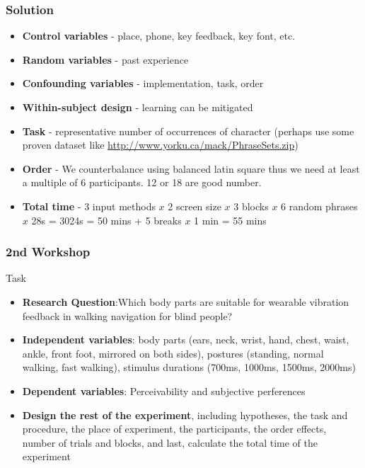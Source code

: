 \documentclass{beamer}
\begin{document}
\begin{frame}
	\footnotesize
	\frametitle{Solution}
	\begin{itemize}
		\item\textbf{Control variables} - place, phone, key feedback, key font, etc.
		\item \textbf{Random variables} - past experience
		\item \textbf{Confounding variables} - implementation, task, order
		\item \textbf{Within-subject design} - learning can be mitigated
		\item \textbf{Task} -  representative number of occurrences of character (perhaps use some proven dataset like \url{http://www.yorku.ca/mack/PhraseSets.zip})
		\item \textbf{Order} - We counterbalance using balanced latin square thus we need at least a multiple of 6 participants.   12 or 18 are good number.
		\item \textbf{Total time} - 3 input methods $x$ 2 screen size $x$ 3 blocks $x$ 6 random phrases $x$ 28s = 3024s = 50 mins + 5 breaks $x$ 1 min = 55 mins
	\end{itemize}
\end{frame}

\begin{frame}
	\frametitle{2nd Workshop}
	\begin{block}{Task}	
	\footnotesize
	\begin{itemize}
	\item \textbf{Research Question}:Which body parts are suitable for wearable vibration feedback in walking navigation for blind people?
	\item \textbf{Independent variables}: body parts (ears, neck, wrist, hand, chest, waist, ankle, front foot, mirrored on both sides), postures (standing, normal walking, fast walking), stimulus durations (700ms, 1000ms, 1500ms, 2000ms)
	\item \textbf{Dependent variables}: Perceivability and subjective perferences
	\item \textbf{Design the rest of the experiment}, including hypotheses, the task and procedure, the place of experiment, the participants, the order effects, number of trials and blocks, and last, calculate the total time of the experiment
	\end{itemize}
	\end{block}
\end{frame}
\end{document}
